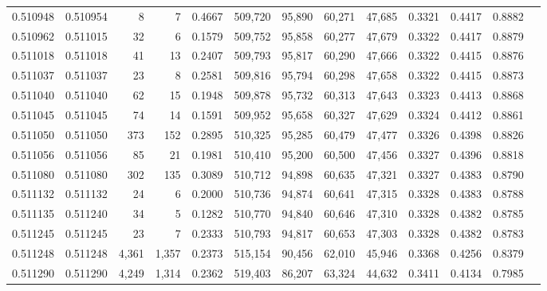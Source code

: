 \begin{tabular}{rrrrrrrrrrrrr}
0.510948 & 0.510954 &     8 &     7 &                                     0.4667 & 509,720 &  95,890 &  60,271 &  47,685 & 0.3321 & 0.4417 & 0.8882 \\
0.510962 & 0.511015 &    32 &     6 &                                     0.1579 & 509,752 &  95,858 &  60,277 &  47,679 & 0.3322 & 0.4417 & 0.8879 \\
0.511018 & 0.511018 &    41 &    13 &                                     0.2407 & 509,793 &  95,817 &  60,290 &  47,666 & 0.3322 & 0.4415 & 0.8876 \\
0.511037 & 0.511037 &    23 &     8 &                                     0.2581 & 509,816 &  95,794 &  60,298 &  47,658 & 0.3322 & 0.4415 & 0.8873 \\
0.511040 & 0.511040 &    62 &    15 &                                     0.1948 & 509,878 &  95,732 &  60,313 &  47,643 & 0.3323 & 0.4413 & 0.8868 \\
0.511045 & 0.511045 &    74 &    14 &                                     0.1591 & 509,952 &  95,658 &  60,327 &  47,629 & 0.3324 & 0.4412 & 0.8861 \\
0.511050 & 0.511050 &   373 &   152 &                                     0.2895 & 510,325 &  95,285 &  60,479 &  47,477 & 0.3326 & 0.4398 & 0.8826 \\
0.511056 & 0.511056 &    85 &    21 &                                     0.1981 & 510,410 &  95,200 &  60,500 &  47,456 & 0.3327 & 0.4396 & 0.8818 \\
0.511080 & 0.511080 &   302 &   135 &                                     0.3089 & 510,712 &  94,898 &  60,635 &  47,321 & 0.3327 & 0.4383 & 0.8790 \\
0.511132 & 0.511132 &    24 &     6 &                                     0.2000 & 510,736 &  94,874 &  60,641 &  47,315 & 0.3328 & 0.4383 & 0.8788 \\
0.511135 & 0.511240 &    34 &     5 &                                     0.1282 & 510,770 &  94,840 &  60,646 &  47,310 & 0.3328 & 0.4382 & 0.8785 \\
0.511245 & 0.511245 &    23 &     7 &                                     0.2333 & 510,793 &  94,817 &  60,653 &  47,303 & 0.3328 & 0.4382 & 0.8783 \\
0.511248 & 0.511248 & 4,361 & 1,357 &                                     0.2373 & 515,154 &  90,456 &  62,010 &  45,946 & 0.3368 & 0.4256 & 0.8379 \\
0.511290 & 0.511290 & 4,249 & 1,314 &                                     0.2362 & 519,403 &  86,207 &  63,324 &  44,632 & 0.3411 & 0.4134 & 0.7985 \\

\end{tabular}
